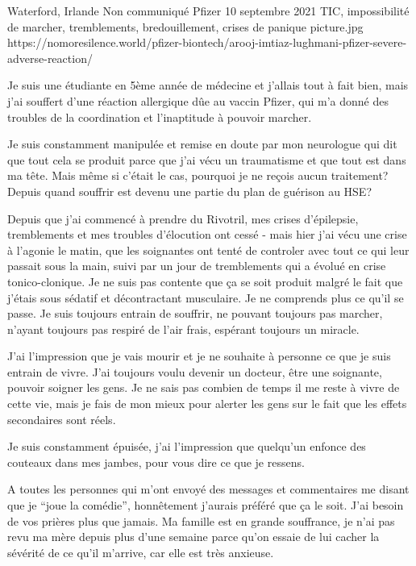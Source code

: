           {Waterford, Irlande}
          {Non communiqué}
          {Pfizer}
          {10 septembre 2021}
          {TIC, impossibilité de marcher, tremblements, bredouillement, crises de panique}
          {picture.jpg}
          {https://nomoresilence.world/pfizer-biontech/arooj-imtiaz-lughmani-pfizer-severe-adverse-reaction/}
          {

Je suis une étudiante en 5ème année de médecine et j'allais tout à fait bien,
mais j'ai souffert d'une réaction allergique dûe au vaccin Pfizer, qui m'a donné
des troubles de la coordination et l'inaptitude à pouvoir marcher.

Je suis constamment manipulée et remise en doute par mon neurologue qui dit que
tout cela se produit parce que j'ai vécu un traumatisme et que tout est dans ma
tête. Mais même si c'était le cas, pourquoi je ne reçois aucun traitement?
Depuis quand souffrir est devenu une partie du plan de guérison au HSE?

Depuis que j'ai commencé à prendre du Rivotril, mes crises d'épilepsie,
tremblements et mes troubles d'élocution ont cessé - mais hier j'ai vécu une
crise à l'agonie le matin, que les soignantes ont tenté de controler avec tout
ce qui leur passait sous la main, suivi par un jour de tremblements qui a évolué
en crise tonico-clonique. Je ne suis pas contente que ça se soit produit malgré
le fait que j'étais sous sédatif et décontractant musculaire. Je ne comprends
plus ce qu'il se passe. Je suis toujours entrain de souffrir, ne pouvant
toujours pas marcher, n'ayant toujours pas respiré de l'air frais, espérant
toujours un miracle.

J'ai l'impression que je vais mourir et je ne souhaite à personne ce que je suis
entrain de vivre. J'ai toujours voulu devenir un docteur, être une soignante,
pouvoir soigner les gens. Je ne sais pas combien de temps il me reste à vivre de
cette vie, mais je fais de mon mieux pour alerter les gens sur le fait que les
effets secondaires sont réels.

Je suis constamment épuisée, j'ai l'impression que quelqu'un enfonce des
couteaux dans mes jambes, pour vous dire ce que je ressens.

A toutes les personnes qui m'ont envoyé des messages et commentaires me disant
que je “joue la comédie”, honnêtement j'aurais préféré que ça le soit. J'ai
besoin de vos prières plus que jamais. Ma famille est en grande souffrance, je
n'ai pas revu ma mère depuis plus d'une semaine parce qu'on essaie de lui cacher
la sévérité de ce qu'il m'arrive, car elle est très anxieuse.

}
